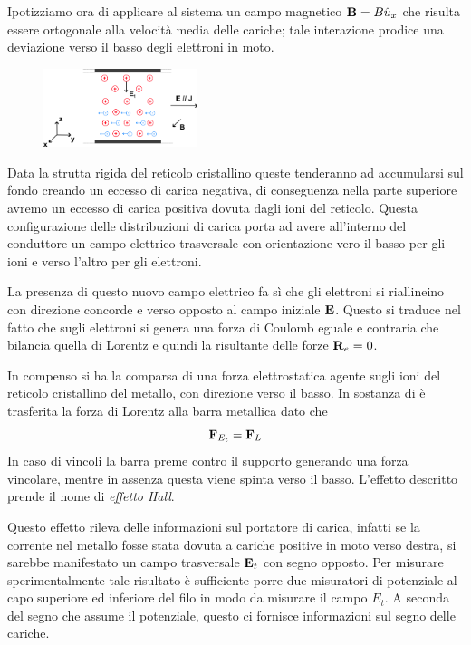  Ipotizziamo ora di applicare al sistema un campo magnetico $\bold{B} = B\hat{u}_{x}$ che risulta essere ortogonale alla velocit\`a media delle cariche; tale interazione prodice una deviazione verso il basso degli elettroni in moto. 
 \newpage 
\begin{figure}  %
    \centering
    \includegraphics[width=0.4\textwidth]{images/hall3}  %
\end{figure}
  Data la strutta rigida del reticolo cristallino queste tenderanno ad accumularsi sul fondo creando un eccesso di carica negativa, di conseguenza nella parte superiore avremo un eccesso di carica positiva dovuta dagli ioni del reticolo. Questa configurazione delle distribuzioni di carica porta ad avere all'interno del conduttore un campo elettrico trasversale con orientazione vero il basso per gli ioni e verso l'altro per gli elettroni.

La presenza di questo nuovo campo elettrico fa s\`i che gli elettroni si riallineino con direzione concorde e verso opposto al campo iniziale $\bold{E}$. Questo si traduce nel fatto che sugli elettroni si genera una forza di Coulomb eguale e contraria che bilancia quella di Lorentz e quindi la risultante delle forze $\bold{R}_{e} = 0$. 

In compenso si ha la comparsa di una forza elettrostatica agente sugli ioni del reticolo cristallino del metallo, con direzione verso il basso. In sostanza di \`e trasferita la forza di Lorentz alla barra metallica dato che 
\begin{equation*}
	\bold{F}_{E_t} = \bold{F}_{L}
\end{equation*}
 In caso di vincoli la barra preme contro il supporto generando una forza vincolare, mentre in assenza questa viene spinta verso il basso. L'effetto descritto prende il nome di \textit{effetto Hall}.
 
 Questo effetto rileva delle informazioni sul portatore di carica, infatti se la corrente nel metallo fosse stata dovuta a cariche positive in moto verso destra, si sarebbe manifestato un campo trasversale $\bold{E}_{t}$ con segno opposto. Per misurare sperimentalmente tale risultato \`e sufficiente porre due misuratori di potenziale al capo superiore ed inferiore del filo in modo da misurare il campo $E_t$. A seconda del segno che assume il potenziale, questo ci fornisce informazioni sul segno delle cariche.
 
